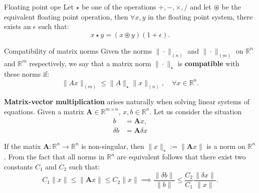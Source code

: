 \documentclass[12pt,a4paper]{book}
\newcommand {\R}{\mathbb{R}}
\newcommand {\1}{\textrm{\textbf{1}}}
\begin{document}
\begin{theorem}{Floating point ope}
    Let $\star$ be one of the operations $+, -, \times, /$ and let $\circledast$ be the equivalent floating point operation, then $\forall x, y$ in the floating point system, there exists an $\epsilon$ such that:
    \[
        x \star y = (x \circledast y)(1 + \epsilon).
    \]
\end{theorem}

\begin{definition}{Compatibility of matrix norms}
  Given the norms $\| \cdot \|_{(n)}$ and $\| \cdot \|_{(m)}$ on $\R^n$ and $\R^{m}$ respectively, we say that a matrix norm $\| \cdot \|_{\star}$ is \textbf{compatible} with these norms if:
  \[
      \| A x \|_{(m)} \leq \| A \|_{\star} \| x \|_{(n)}, \quad \forall x \in \R^n.
  \]
\end{definition}

\noindent \textbf{Matrix-vector multiplication} arises naturally when solving linear systems of equations. Given a matrix $\mathbf{A} \in \R^{m \times n}$, $x, b \in \R^n$. Let us consider the situation
\begin{align*}
    b &= \mathbf{A} x \text{,} \\
    \delta b &= \mathbf{A} \delta x
\end{align*}

\noindent If the matix $\mathbf{A}: \R^n \to \R^n$ is non-singular, then $\| x \|_{\star} := \| \mathbf{A} x \|$ is a norm on $\R^n$. From the fact that all norms 
in $\R^n$ are equivalent follows that there exist two constants $C_1$ and $C_2$ such that:\\
\[
    C_1 \| x \| \leq \|\mathbf{A} x\| \leq C_2 \| x \| \implies \frac{\| \delta b \|}{\| b \|} \leq \frac{C_2}{C_1} \frac{\| \delta x \|}{\| x \|}.
\]

\end{document}
